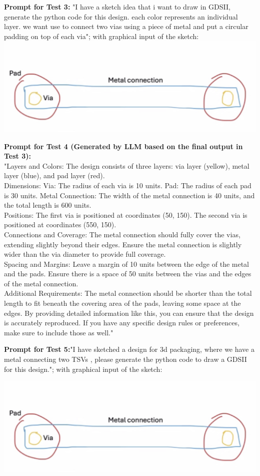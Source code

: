 \documentclass{article}
\begin{document}
\textbf{Prompt for Test 3:} "I have a sketch idea that i want to draw in GDSII, generate the python code for this design. each color represents an individual layer. we want use to connect two vias using a piece of metal and put a circular padding on top of each via"; with graphical input of the sketch:
\includegraphics[width=0.5\linewidth]{sketch.png}

\textbf{Prompt for Test 4 (Generated by LLM based on the final output in Test 3):}\\
"Layers and Colors:
The design consists of three layers: via layer (yellow), metal layer (blue), and pad layer (red).\\
Dimensions:
Via: The radius of each via is 10 units.
Pad: The radius of each pad is 30 units.
Metal Connection: The width of the metal connection is 40 units, and the total length is 600 units.\\
Positions:
The first via is positioned at coordinates (50, 150).
The second via is positioned at coordinates (550, 150).\\
Connections and Coverage:
The metal connection should fully cover the vias, extending slightly beyond their edges.
Ensure the metal connection is slightly wider than the via diameter to provide full coverage.\\
Spacing and Margins:
Leave a margin of 10 units between the edge of the metal and the pads.
Ensure there is a space of 50 units between the vias and the edges of the metal connection.\\
Additional Requirements:
The metal connection should be shorter than the total length to fit beneath the covering area of the pads, leaving some space at the edges.
By providing detailed information like this, you can ensure that the design is accurately reproduced. If you have any specific design rules or preferences, make sure to include those as well."

\textbf{Prompt for Test 5:}"I have sketched a design for 3d packaging, where we have a metal connecting two TSVs , please generate the python code to draw a GDSII for this design."; with graphical input of the sketch: 

\includegraphics[width=0.5\linewidth]{sketch.png}
\end{document}
